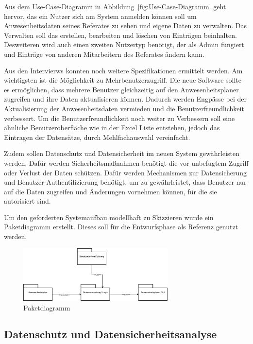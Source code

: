 Aus dem Use-Case-Diagramm in Abbildung~\ref{fig:Use-Case-Diagramm} geht hervor, das ein Nutzer sich am System anmelden können soll um Anwesenheitsdaten seines Referates zu sehen und eigene Daten zu verwalten. Das Verwalten soll das erstellen, bearbeiten und löschen von Einträgen beinhalten. Desweiteren wird auch einen zweiten Nutzertyp benötigt, der als Admin fungiert und Einträge von anderen Mitarbeitern des Referates ändern kann.

Aus den Intervierws konnten noch weitere Spezifikationen ermittelt werden. Am wichtigsten ist die Möglichkeit zu Mehrbenutzerzugriff. Die neue Software sollte es ermöglichen, dass mehrere Benutzer gleichzeitig auf den Anwesenheitsplaner zugreifen und ihre Daten aktualisieren können. Dadurch werden Engpässe bei der Aktualisierung der Anwesenheitsdaten vermieden und die Benutzerfreundlichkeit verbessert. Um die Benutzerfreundlichkeit noch weiter zu Verbessern soll eine ähnliche Benutzeroberfläche wie in der Excel Liste entstehen, jedoch das Eintragen der Datensätze, durch \zB Mehlfachauswahl vereinfacht.

Zudem sollen Datenschutz und Datensicherheit im neuen System gewährleisten werden. Dafür werden Sicherheitsmaßnahmen benötigt die vor unbefugtem Zugriff oder Verlust der Daten schützen. Dafür werden Mechanismen zur Datensicherung und Benutzer-Authentifizierung benötigt, um zu gewährleistet, dass Benutzer nur auf die Daten zugreifen und Änderungen vornehmen können, für die sie autorisiert sind.

Um den geforderten Systemaufbau modellhaft zu Skizzieren wurde ein Paketdiagramm erstellt. Dieses soll für die Entwurfsphase als Referenz genutzt werden.

\begin{figure}[htb]
    \centering
    \includegraphics[width=0.7\textwidth,angle=0]{abb/Paketdiagramm.pdf}
    \caption[Beschreibung]{Paketdiagramm}
    \label{fig:Paketdiagramm}
\end{figure}

\subsection{Datenschutz und Datensicherheitsanalyse}
\label{sec:Datenschutz}

